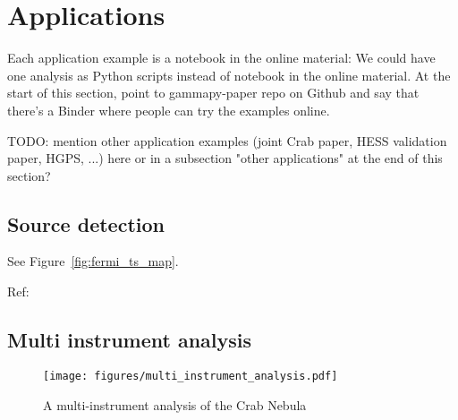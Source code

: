 \section{Applications}
\label{sec:applications}

Each application example is a notebook in the online material: We could have
one analysis as Python scripts instead of notebook in the online material. At
the start of this section, point to gammapy-paper repo on Github and say that
there’s a Binder where people can try the examples online.

TODO: mention other application examples (joint Crab paper, HESS validation
paper, HGPS, ...) here or in a subsection "other applications" at the end of
this section?

\subsection{Source detection}
\label{ssec:source-detection}

See Figure~\ref{fig:fermi_ts_map}.

Ref:~\citep{Stewart2009}

\subsection{Multi instrument analysis}
\label{ssec:multi-instrument-analysis}

\begin{figure*}[t]
	\centering
	\texttt{[image: figures/multi\_instrument\_analysis.pdf]}
	\caption{A multi-instrument analysis of the Crab Nebula}
	\label{fig:multi_instrument_analysis} 
\end{figure*}
